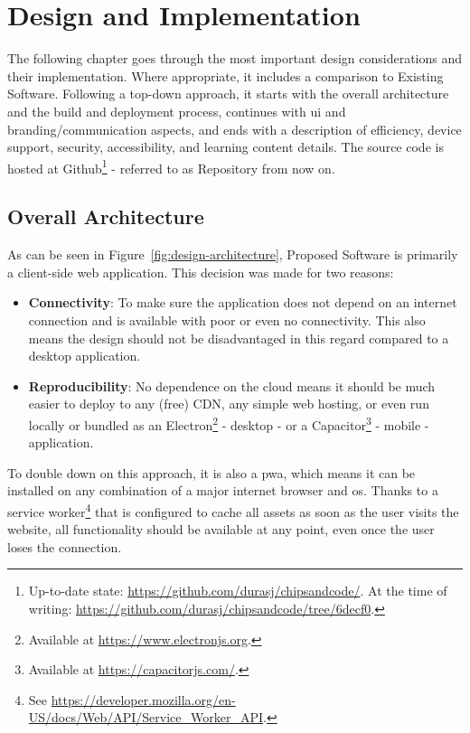 \chapter{Design and Implementation}
\label{Design-Implementation}

The following chapter goes through the most important design considerations and their implementation.
Where appropriate, it includes a comparison to Existing Software.
Following a top-down approach, it starts with the overall architecture and the build and deployment process, continues with \gls{ui} and branding/communication aspects, and ends with a description of efficiency, device support, security, accessibility, and learning content details.
The source code is hosted at Github\footnote{Up-to-date state: \url{https://github.com/durasj/chipsandcode/}. At the time of writing: \url{https://github.com/durasj/chipsandcode/tree/6decf0}.} - referred to as Repository from now on.

\section{Overall Architecture}
\label{sec:architecture}

As can be seen in Figure~\ref{fig:design-architecture}, Proposed Software is primarily a client-side web application.
This decision was made for two reasons:

\begin{itemize}
    \item \textbf{Connectivity}: To make sure the application does not depend on an internet connection and is available with poor or even no connectivity. This also means the design should not be disadvantaged in this regard compared to a desktop application.
    \item \textbf{Reproducibility}: No dependence on the cloud means it should be much easier to deploy to any (free) CDN, any simple web hosting, or even run locally or bundled as an Electron\footnote{Available at \url{https://www.electronjs.org}.} - desktop - or a Capacitor\footnote{Available at \url{https://capacitorjs.com/}.} - mobile - application.
\end{itemize}

To double down on this approach, it is also a \gls{pwa}, which means it can be installed on any combination of a major internet browser and \gls{os}.
Thanks to a service worker\footnote{See \url{https://developer.mozilla.org/en-US/docs/Web/API/Service_Worker_API}.} that is configured to cache all assets as soon as the user visits the website, all functionality should be available at any point, even once the user loses the connection.

